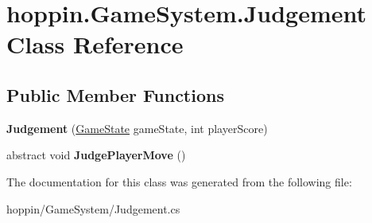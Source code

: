 \hypertarget{classhoppin_1_1_game_system_1_1_judgement}{}\section{hoppin.\+Game\+System.\+Judgement Class Reference}
\label{classhoppin_1_1_game_system_1_1_judgement}
\subsection*{Public Member Functions}
\begin{DoxyCompactItemize}
\item 
{\bfseries Judgement} (\hyperlink{classhoppin_1_1_game_system_1_1_game_state}{Game\+State} game\+State, int player\+Score)\hypertarget{classhoppin_1_1_game_system_1_1_judgement_a69f21fd0959cfd8a41e79fced24d0768}{}\label{classhoppin_1_1_game_system_1_1_judgement_a69f21fd0959cfd8a41e79fced24d0768}

\item 
abstract void {\bfseries Judge\+Player\+Move} ()\hypertarget{classhoppin_1_1_game_system_1_1_judgement_ac2aedd52103fdf68766390f2fb4487a3}{}\label{classhoppin_1_1_game_system_1_1_judgement_ac2aedd52103fdf68766390f2fb4487a3}

\end{DoxyCompactItemize}


The documentation for this class was generated from the following file\+:\begin{DoxyCompactItemize}
\item 
hoppin/\+Game\+System/Judgement.\+cs\end{DoxyCompactItemize}
